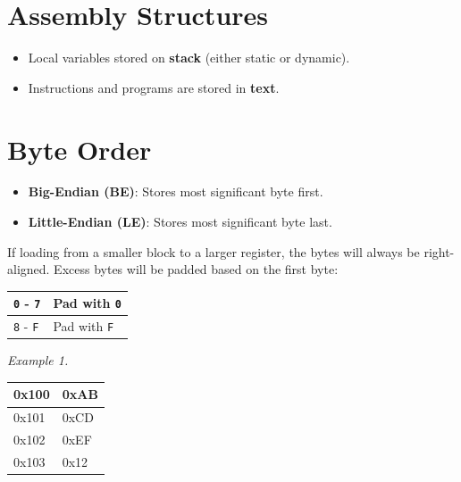 \documentclass[12pt, letterpaper]{article}
\begin{document}
\part*{Assembly Structures}

\begin{itemize}
  \item Local variables stored on \textbf{stack} (either static or dynamic).
  \item Instructions and programs are stored in \textbf{text}.
\end{itemize}

\part*{Byte Order}

\begin{itemize}
  \item \textbf{Big-Endian (BE)}: Stores most significant byte first.
  \item \textbf{Little-Endian (LE)}: Stores most significant byte last.
\end{itemize}

If loading from a smaller block to a larger register, the bytes will
always be right-aligned. Excess bytes will be padded based on the first byte:

\begin{table}[!ht]
  \begin{center}
    \begin{tabular}{|l|l|}
      \hline
      \texttt{0} - \texttt{7} & Pad with \texttt{0} \\ \hline
      \texttt{8} - \texttt{F} & Pad with \texttt{F} \\ \hline
    \end{tabular}%
  \end{center}
\end{table}
\FloatBarrier

\textit{Example 1.}

\begin{table}[!ht]
  \begin{center}
    \begin{tabular}{|l|l|}
      \hline
      0x100 & 0xAB \\ \hline
      0x101 & 0xCD \\ \hline
      0x102 & 0xEF \\ \hline
      0x103 & 0x12 \\ \hline
    \end{tabular}%
  \end{center}
\end{table}
\FloatBarrier
\end{document}
